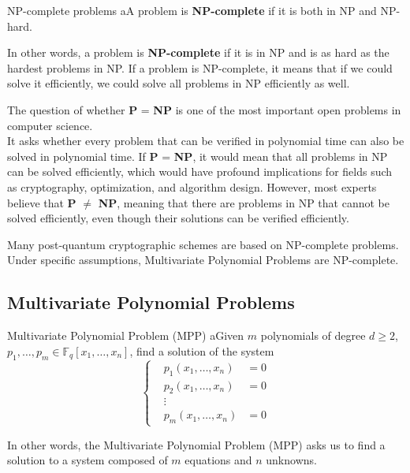 \begin{defBox}{NP-complete problems}
    aA problem is \textbf{NP-complete} if it is both in NP and NP-hard.
\end{defBox}
\noindent
In other words, a problem is \textbf{NP-complete} if it is in NP and is as hard as the hardest problems in NP. If a problem is NP-complete, it means that if we could solve it efficiently, we could solve all problems in NP efficiently as well.
\bigskip

\noindent
The question of whether \textbf{P} = \textbf{NP} is one of the most important open problems in computer science. \\
It asks whether every problem that can be verified in polynomial time can also be solved in polynomial time. If \textbf{P} = \textbf{NP}, it would mean that all problems in NP can be solved efficiently, which would have profound implications for fields such as cryptography, optimization, and algorithm design. However, most experts believe that \textbf{P} $\neq$ \textbf{NP}, meaning that there are problems in NP that cannot be solved efficiently, even though their solutions can be verified efficiently.
\vspace{0.5 cm}

\noindent
Many post-quantum cryptographic schemes are based on NP-complete problems.\\
Under specific assumptions, Multivariate Polynomial Problems are NP-complete.

\subsection{Multivariate Polynomial Problems}
\begin{defBox}{Multivariate Polynomial Problem (MPP)}
    aGiven $m$ polynomials of degree $d \geq 2$, $p_1, \ldots, p_m \in \mathbb{F}_q[x_1, \ldots, x_n]$, find a solution of the system
    \[
        \left\{
        \begin{aligned}
            &p_1(x_1, \ldots, x_n) &= 0\\
            &p_2(x_1, \ldots, x_n) &= 0\\
            &\vdots\\
            &p_m(x_1, \ldots, x_n) &= 0
        \end{aligned}
        \right.
    \]
\end{defBox}
\noindent
In other words, the Multivariate Polynomial Problem (MPP) asks us to find a solution to a system composed of $m$ equations and $n$ unknowns.
\medskip

